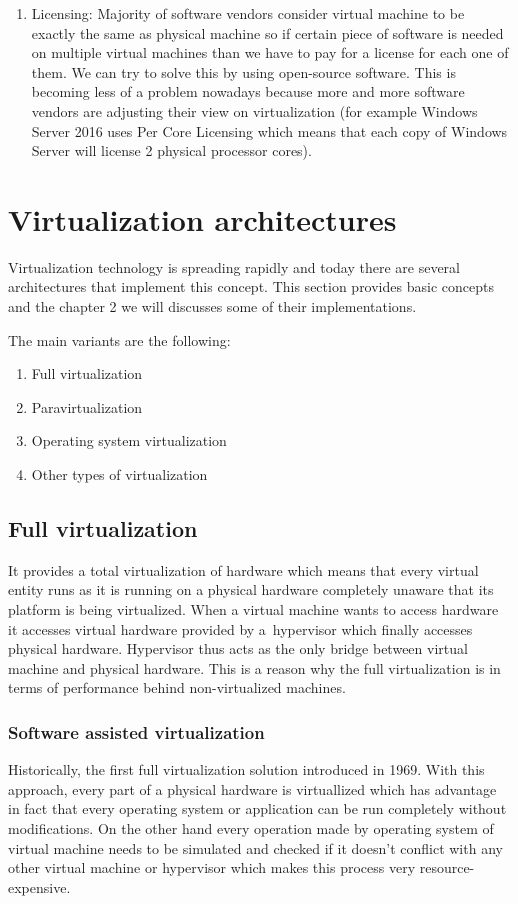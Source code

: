\begin{enumerate}
\item Licensing: Majority of software vendors consider virtual machine to be exactly the same as physical machine so if certain piece of software is needed on multiple virtual machines than we have to pay for a license for each one of them. We can try to solve this by using open-source software. This is becoming less of a problem nowadays because more and more software vendors are adjusting their view on virtualization (for example Windows Server 2016 uses Per Core Licensing which means that each copy of Windows Server will license 2 physical processor cores).
\end{enumerate}

\section{Virtualization architectures}
Virtualization technology is spreading rapidly and today there are several architectures that implement this concept. This section provides basic concepts and the chapter 2 we will discusses some of their implementations.

The main variants are the following:
\begin{enumerate}
\item Full virtualization
\item Paravirtualization
\item Operating system virtualization
\item Other types of virtualization
\end{enumerate}

\subsection{Full virtualization} 
\label{full_virt}
It provides a total virtualization of hardware which means that every virtual entity runs as it is running on a physical hardware completely unaware that its platform is being virtualized. When a virtual machine wants to access hardware it accesses virtual hardware provided by a~hypervisor which finally accesses physical hardware. Hypervisor thus acts as the only bridge between virtual machine and physical hardware. This is a reason why the full virtualization is in terms of performance behind non-virtualized machines.
\subsubsection{Software assisted virtualization}
Historically, the first full virtualization solution introduced in 1969. With this approach, every part of a physical hardware is virtuallized which has advantage in fact that every operating system or application can be run completely without modifications. On the other hand every operation made by operating system of virtual machine needs to be simulated and checked if it doesn't conflict with any other virtual machine or hypervisor which makes this process very resource-expensive.

